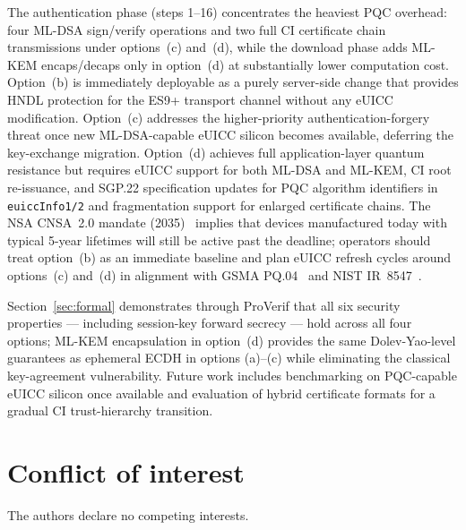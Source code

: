 \documentclass[final,3p,times,twocolumn]{elsarticle}
\begin{document}
The authentication phase (steps 1--16) concentrates the heaviest PQC
overhead: four ML-DSA sign/verify operations and two full CI certificate chain
transmissions under options~(c) and~(d), while the download phase adds ML-KEM
encaps/decaps only in option~(d) at substantially lower computation cost.
Option~(b) is immediately deployable as a purely server-side change that
provides HNDL protection for the ES9+ transport channel without any eUICC
modification.  Option~(c) addresses the higher-priority authentication-forgery
threat once new ML-DSA-capable eUICC silicon becomes available, deferring the
key-exchange migration.  Option~(d) achieves full application-layer quantum
resistance but requires eUICC support for both ML-DSA and ML-KEM, CI root
re-issuance, and SGP.22 specification updates for PQC algorithm identifiers
in \texttt{euiccInfo1/2} and fragmentation support for enlarged certificate
chains.  The NSA CNSA~2.0 mandate (2035)~\citep{nsa_cnsa2} implies that
devices manufactured today with typical 5-year lifetimes will still be active
past the deadline; operators should treat option~(b) as an immediate baseline
and plan eUICC refresh cycles around options~(c) and~(d) in alignment with
GSMA PQ.04~\citep{gsma_pq04} and NIST IR~8547~\citep{nist_ir8547}.

Section~\ref{sec:formal} demonstrates through ProVerif that all six
security properties — including session-key forward secrecy — hold across
all four options; ML-KEM encapsulation in option~(d) provides the same
Dolev-Yao-level guarantees as ephemeral ECDH in options (a)--(c) while
eliminating the classical key-agreement vulnerability.
Future work includes benchmarking on PQC-capable eUICC silicon once
available and evaluation of hybrid certificate formats for a gradual CI
trust-hierarchy transition.

\section*{Conflict of interest}
The authors declare no competing interests.



\end{document}
